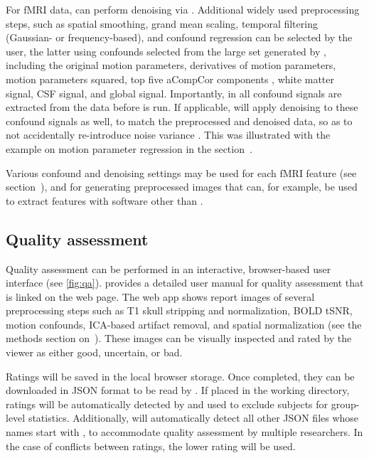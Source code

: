 For fMRI data,  can perform denoising via 
\parencite{10.1016/j.neuroimage.2015.02.064}. Additional widely used
preprocessing steps, such as spatial smoothing, grand mean scaling,
temporal filtering (Gaussian- or frequency-based), and confound regression
can be selected by the user, the latter using confounds selected from the
large set generated by , including the original motion
parameters, derivatives of motion parameters, motion parameters squared,
top five aCompCor components \parencite{10.1016/j.neuroimage.2007.04.042},
white matter signal, CSF signal, and global signal. Importantly, in
 all confound signals are extracted from the data before
 is run. If applicable,  will apply
denoising to these confound signals as well, to match the preprocessed and
denoised data, so as to not accidentally re-introduce noise variance
\parencite{10.1016/j.neuroimage.2013.05.116,10.1002/hbm.24528}. This was
illustrated with the example on motion parameter regression in the
section~.

Various confound and denoising settings may be used for each fMRI feature
(see section~), and for generating
preprocessed images that can, for example, be used to extract features with
software other than .

\subsection{Quality assessment}

Quality assessment can be performed in an interactive, browser-based user
interface (see \autoref{fig:qa}).  provides a
detailed user manual for quality assessment that is linked on the web page.
The web app shows report images of several preprocessing steps such as T1
skull stripping and normalization, BOLD tSNR, motion confounds, ICA-based
artifact removal, and spatial normalization (see the methods section
on~). These images can be visually inspected and
rated by the viewer as either good, uncertain, or bad.

Ratings will be saved in the local browser storage. Once completed, they
can be downloaded in JSON format to be read by . If placed
in the working directory, ratings will be automatically detected by
 and used to exclude subjects for group-level statistics.
Additionally,  will automatically detect all other JSON
files whose names start with , to accommodate quality
assessment by multiple researchers. In the case of conflicts between
ratings, the lower rating will be used.

